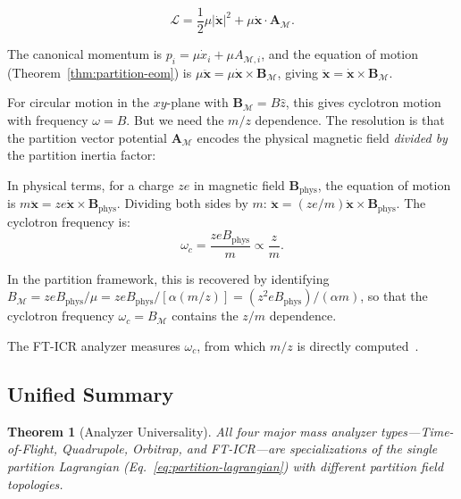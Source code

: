 \documentclass[11pt,twocolumn,a4paper]{article}
\newtheorem{theorem}{Theorem}[section]
\theoremstyle{definition}
\theoremstyle{remark}
\newcommand{\Depth}{\mathcal{M}}
\newcommand{\partinert}{\mu}
\newcommand{\Apartition}{\mathbf{A}_{\mathcal{M}}}
\newcommand{\Lagr}{\mathcal{L}}
\begin{document}
\[
  \Lagr = \frac{1}{2}\partinert |\dot{\mathbf{x}}|^2 + \partinert \dot{\mathbf{x}} \cdot \Apartition.
\]

The canonical momentum is $p_i = \partinert \dot{x}_i + \partinert A_{\Depth,i}$, and the equation of motion (Theorem~\ref{thm:partition-eom}) is $\partinert \ddot{\mathbf{x}} = \partinert \dot{\mathbf{x}} \times \mathbf{B}_\Depth$, giving $\ddot{\mathbf{x}} = \dot{\mathbf{x}} \times \mathbf{B}_\Depth$.

For circular motion in the $xy$-plane with $\mathbf{B}_\Depth = B\hat{z}$, this gives cyclotron motion with frequency $\omega = B$. But we need the $m/z$ dependence. The resolution is that the partition vector potential $\Apartition$ encodes the physical magnetic field \emph{divided by} the partition inertia factor:

In physical terms, for a charge $ze$ in magnetic field $\mathbf{B}_{\mathrm{phys}}$, the equation of motion is $m\ddot{\mathbf{x}} = ze\dot{\mathbf{x}} \times \mathbf{B}_{\mathrm{phys}}$. Dividing both sides by $m$: $\ddot{\mathbf{x}} = (ze/m)\dot{\mathbf{x}} \times \mathbf{B}_{\mathrm{phys}}$. The cyclotron frequency is:
\begin{equation}
\label{eq:fticr}
  \boxed{\omega_c = \frac{zeB_{\mathrm{phys}}}{m} \propto \frac{z}{m}}.
\end{equation}

In the partition framework, this is recovered by identifying $B_\Depth = zeB_{\mathrm{phys}}/\partinert = zeB_{\mathrm{phys}}/[\alpha(m/z)] = (z^2 e B_{\mathrm{phys}})/(\alpha m)$, so that the cyclotron frequency $\omega_c = B_\Depth$ contains the $z/m$ dependence.

The FT-ICR analyzer measures $\omega_c$, from which $m/z$ is directly computed~\citep{marshall1998}.

\subsection{Unified Summary}
\label{sec:unified-summary}

\begin{theorem}[Analyzer Universality]
\label{thm:analyzer-universality}
All four major mass analyzer types---Time-of-Flight, Quadrupole, Orbitrap, and FT-ICR---are specializations of the single partition Lagrangian (Eq.~\ref{eq:partition-lagrangian}) with different partition field topologies.
\end{theorem}
\end{document}
